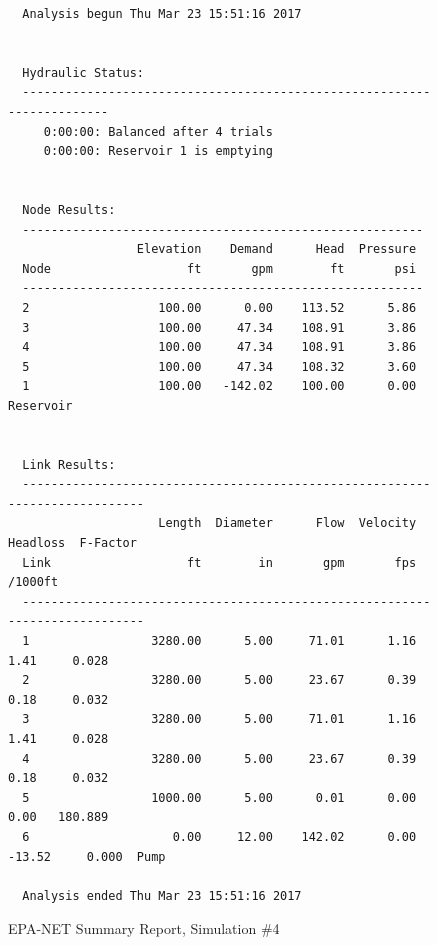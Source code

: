 \documentclass[11pt]{article}
\begin{document}
\begin{enumerate}
\begin{figure}[ht!]
\begin{verbatim}
  Analysis begun Thu Mar 23 15:51:16 2017

   
  Hydraulic Status:
  -----------------------------------------------------------------------
     0:00:00: Balanced after 4 trials
     0:00:00: Reservoir 1 is emptying
   
   
  Node Results:
  --------------------------------------------------------
                  Elevation    Demand      Head  Pressure
  Node                   ft       gpm        ft       psi
  --------------------------------------------------------
  2                  100.00      0.00    113.52      5.86
  3                  100.00     47.34    108.91      3.86
  4                  100.00     47.34    108.91      3.86
  5                  100.00     47.34    108.32      3.60
  1                  100.00   -142.02    100.00      0.00  Reservoir
   
   
  Link Results:
  ----------------------------------------------------------------------------
                     Length  Diameter      Flow  Velocity  Headloss  F-Factor
  Link                   ft        in       gpm       fps   /1000ft          
  ----------------------------------------------------------------------------
  1                 3280.00      5.00     71.01      1.16      1.41     0.028
  2                 3280.00      5.00     23.67      0.39      0.18     0.032
  3                 3280.00      5.00     71.01      1.16      1.41     0.028
  4                 3280.00      5.00     23.67      0.39      0.18     0.032
  5                 1000.00      5.00      0.01      0.00      0.00   180.889
  6                    0.00     12.00    142.02      0.00    -13.52     0.000  Pump
   
  Analysis ended Thu Mar 23 15:51:16 2017  \end{verbatim}
     \caption{EPA-NET Summary Report, Simulation \#4}
   \label{fig:epanet4} 
\end{figure}
\clearpage


\end{enumerate}
\end{document}
